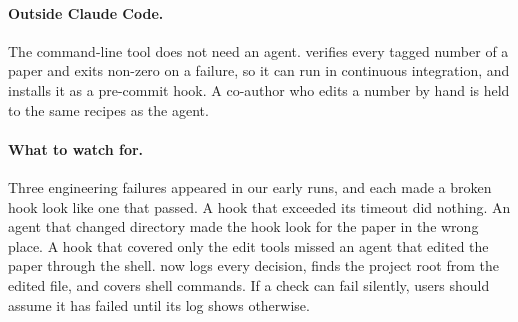 \paragraph{Outside Claude Code.}
The command-line tool does not need an agent.  verifies every tagged number of a paper and
exits non-zero on a failure, so it can run in continuous integration, and  installs it as a
pre-commit hook. A co-author who edits a number by hand is held to the same recipes as the agent.

\paragraph{What to watch for.}
Three engineering failures appeared in our early runs, and each made a broken hook look like one that passed. A hook
that exceeded its timeout did nothing. An agent that changed directory made the hook look for the paper in the wrong
place. A hook that covered only the edit tools missed an agent that edited the paper through the shell. \tool{} now
logs every decision, finds the project root from the edited file, and covers shell commands. If a check can fail
silently, users should assume it has failed until its log shows otherwise.
